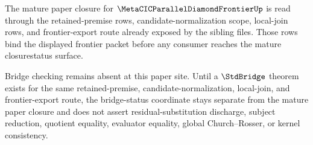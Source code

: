 The mature paper closure for $\MetaCICParallelDiamondFrontierUp$ is read through the retained-premise rows, candidate-normalization scope, local-join rows, and frontier-export route already exposed by the sibling files. Those rows bind the displayed frontier packet before any consumer reaches the mature closurestatus surface.

Bridge checking remains absent at this paper site. Until a $\StdBridge$ theorem exists for the same retained-premise, candidate-normalization, local-join, and frontier-export route, the bridge-status coordinate stays separate from the mature paper closure and does not assert residual-substitution discharge, subject reduction, quotient equality, evaluator equality, global Church--Rosser, or kernel consistency.
